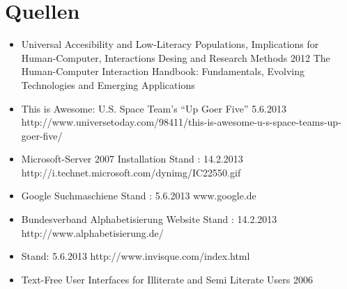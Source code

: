 \newpage 



\thispagestyle{empty}



 \section*{Quellen}




\begin{itemize}
 	 \item {}
					{Universal Accesibility and Low-Literacy Populations, Implications for Human-Computer, Interactions Desing and Research Methods}
					{2012}
					{The Human-Computer Interaction Handbook: Fundamentals, Evolving Technologies and Emerging Applications}

	 \item {}
				{This is Awesome: U.S. Space Team’s “Up Goer Five”}
				{5.6.2013}
				{http://www.universetoday.com/98411/this-is-awesome-u-s-space-teams-up-goer-five/}


	 \item {}
						{Microsoft-Server 2007 Installation}
						{Stand : 14.2.2013}
						{http://i.technet.microsoft.com/dynimg/IC22550.gif} 

	 \item {}
						{Google Suchmaschiene}
						{Stand : 5.6.2013}
						{www.google.de}

	 \item {}
						{Bundesverband Alphabetisierung Website}
						{Stand : 14.2.2013}
						{http://www.alphabetisierung.de/}

	 \item {}
						{Stand: 5.6.2013}
						{http://www.invisque.com/index.html}{}

	 \item {}
					{Text-Free User Interfaces for Illiterate and Semi Literate Users}
					{2006}
					{}




\end{itemize}
